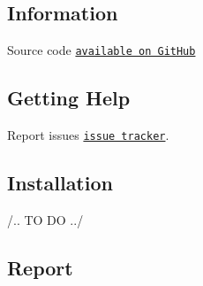 
\begin{DoxyItemize}
\item 
\end{DoxyItemize}

\subsection*{Information}


\begin{DoxyItemize}
\item Source code \href{https://github.com/lpgoulart/GameOfTurns}{\tt available on Git\+Hub}
\end{DoxyItemize}

\subsection*{Getting Help}


\begin{DoxyItemize}
\item Report issues \href{https://github.com/lpgoulart/GameOfTurns/issues}{\tt issue tracker}.
\end{DoxyItemize}

\subsection*{Installation}

/.. TO DO ../

\subsection*{Report}
